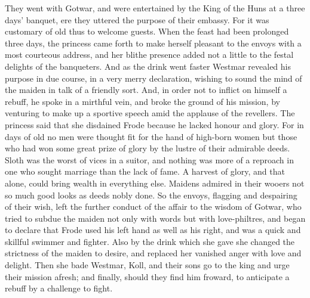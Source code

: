 \documentclass[10pt,a4paper]{report}
\begin{document}
They went with Gotwar, and were entertained by the King of the Huns at a three days' banquet, ere they uttered the purpose of their embassy. For it was customary of old thus to welcome guests. When the feast had been prolonged three days, the princess came forth to make herself pleasant to the envoys with a most courteous address, and her blithe presence added not a little to the festal delights of the banqueters. And as the drink went faster Westmar revealed his purpose in due course, in a very merry declaration, wishing to sound the mind of the maiden in talk of a friendly sort. And, in order not to inflict on himself a rebuff, he spoke in a mirthful vein, and broke the ground of his mission, by venturing to make up a sportive speech amid the applause of the revellers. The princess said that she disdained Frode because he lacked honour and glory. For in days of old no men were thought fit for the hand of high-born women but those who had won some great prize of glory by the lustre of their admirable deeds. Sloth was the worst of vices in a suitor, and nothing was more of a reproach in one who sought marriage than the lack of fame. A harvest of glory, and that alone, could bring wealth in everything else. Maidens admired in their wooers not so much good looks as deeds nobly done. So the envoys, flagging and despairing of their wish, left the further conduct of the affair to the wisdom of Gotwar, who tried to subdue the maiden not only with words but with love-philtres, and began to declare that Frode used his left hand as well as his right, and was a quick and skillful swimmer and fighter. Also by the drink which she gave she changed the strictness of the maiden to desire, and replaced her vanished anger with love and delight. Then she bade Westmar, Koll, and their sons go to the king and urge their mission afresh; and finally, should they find him froward, to anticipate a rebuff by a challenge to fight.\\
\end{document}
